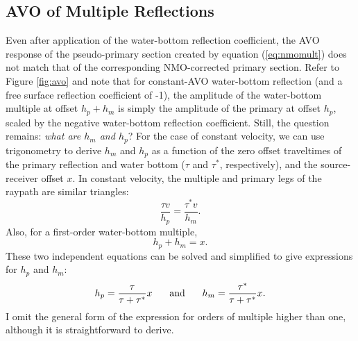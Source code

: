 
\subsection{AVO of Multiple Reflections}
Even after application of the water-bottom reflection coefficient, the AVO response of the
pseudo-primary section created by equation (\ref{eq:nmomult}) does not match that of the
corresponding NMO-corrected primary section.  Refer to Figure \ref{fig:avo} and note that 
for constant-AVO water-bottom reflection (and a free surface reflection coefficient of
-1), the amplitude of the water-bottom multiple at 
offset $h_p+h_m$ is simply the amplitude of the primary at offset $h_p$, scaled by the 
negative water-bottom reflection coefficient.  Still, the question remains: {\em what are $h_m$
and $h_p$}?  For the case of constant velocity, we can use trigonometry to derive $h_m$
and $h_p$ as a function of the zero offset traveltimes of the primary reflection and
water bottom ($\tau$ and $\tau^*$, respectively), and the source-receiver offset $x$.
In constant velocity, the multiple and primary legs of the raypath are similar triangles:
\begin{equation}
	\frac{\tau v}{h_p} = \frac{\tau^* v}{h_m}. \label{eq:triangles}
\end{equation}
Also, for a first-order water-bottom multiple,
\[ h_p + h_m = x. \]
These two independent equations can be solved and simplified to give expressions for 
$h_p$ and $h_m$:
\begin{equation}
	h_p = \frac{\tau}{\tau+\tau^*}x \hspace{0.2in} \mbox{ and } \hspace{0.2in}
	h_m = \frac{\tau^*}{\tau+\tau^*}x. \label{eq:avo}
\end{equation}
I omit the general form of the expression for orders of multiple higher than one, although 
it is straightforward to derive.

